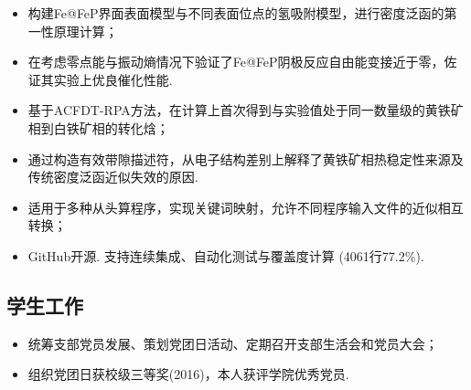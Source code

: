 {
    \begin{itemize}
        \item 构建Fe@FeP界面表面模型与不同表面位点的氢吸附模型，进行密度泛函的第一性原理计算；
        \item 在考虑零点能与振动熵情况下验证了Fe@FeP阴极反应自由能变接近于零，佐证其实验上优良催化性能.
    \end{itemize}
}

{
    \begin{itemize}%
        \item 基于ACFDT-RPA方法，在计算上首次得到与实验值处于同一数量级的黄铁矿相到白铁矿相的转化焓；
        \item 通过构造有效带隙描述符，从电子结构差别上解释了黄铁矿相热稳定性来源及传统密度泛函近似失效的原因.
    \end{itemize}
}

{
    \begin{itemize}%
        \item 适用于多种从头算程序，实现关键词映射，允许不同程序输入文件的近似相互转换；
        \item GitHub开源. 支持连续集成、自动化测试与覆盖度计算 (4061行77.2\%).
    \end{itemize}
}
\subsection{\hei 学生工作}

{
  \begin{itemize}%
  \item 统筹支部党员发展、策划党团日活动、定期召开支部生活会和党员大会；
  \item 组织党团日获校级三等奖(2016)，本人获评学院优秀党员.
  \end{itemize}
}
{
}

%
%

